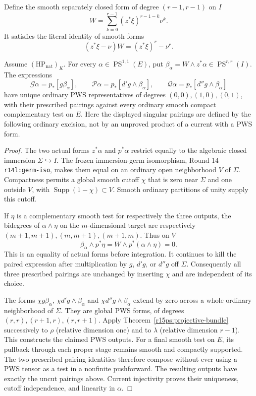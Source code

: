 Define the smooth separately closed form of degree $(r-1,r-1)$
on $I$
\[
             W=\sum_{k=0}^{r-1}(z^*\xi)^{r-1-k}\nu^k.
\tag{I15.8}\label{r15i:W}
\]
It satisfies the literal identity of smooth forms
\[
                      (z^*\xi-\nu)W=(z^*\xi)^r-\nu^r.
\tag{I15.9}\label{r15i:telescoping}
\]

\begin{proposition}
\label{r15i:outputs}
Assume $(\mathrm{HP}_{\mathrm{nat}})_K$.
For every $\alpha\in\operatorname{PS}^{1,1}(E)$, put
$\beta_\alpha=W\wedge z^*\alpha\in
\operatorname{PS}^{r,r}(I)$.  The expressions
\[
 \mathcal G\alpha=p_*[g\beta_\alpha],\qquad
 \mathcal P\alpha=p_*[d'g\wedge\beta_\alpha],\qquad
 \mathcal Q\alpha=p_*[d''g\wedge\beta_\alpha]
\tag{I15.10}\label{r15i:three-outputs}
\]
have unique ordinary PWS representatives of degrees
$(0,0),(1,0),(0,1)$, with their prescribed pairings against
every ordinary smooth compact complementary test on $E$.
Here the displayed singular pairings are defined by the
following ordinary excision, not by an unproved product of
a current with a PWS form.
\end{proposition}

\begin{proof}
The two actual forms $z^*\alpha$ and $p^*\alpha$ restrict
equally to the algebraic closed immersion $\Sigma\hookrightarrow I$.
The frozen immersion-germ isomorphism, Round 14
\texttt{r14l:germ-iso}, makes them equal on an ordinary open
neighborhood $V$ of $\Sigma$.  Compactness permits a global
smooth cutoff $\chi$ that is zero near $\Sigma$ and one
outside $V$, with $\operatorname{Supp}(1-\chi)\subset V$.
Smooth ordinary partitions of unity supply this cutoff.

If $\eta$ is a complementary smooth test for respectively
the three outputs, the bidegrees of $\alpha\wedge\eta$ on
the $m$-dimensional target are respectively
$(m+1,m+1),(m,m+1),(m+1,m)$.
Thus on $V$
\[
             \beta_\alpha\wedge p^*\eta
                 =W\wedge p^*(\alpha\wedge\eta)=0.
\tag{I15.11}\label{r15i:cutoff-zero}
\]
This is an equality of actual forms before integration.
It continues to kill the paired expression after multiplication
by $g$, $d'g$, or $d''g$ off $\Sigma$.
Consequently all three prescribed pairings are unchanged by
inserting $\chi$ and are independent of its choice.

The forms $\chi g\beta_\alpha$,
$\chi d'g\wedge\beta_\alpha$ and
$\chi d''g\wedge\beta_\alpha$ extend by zero across a
whole ordinary neighborhood of $\Sigma$.  They are global
PWS forms, of degrees $(r,r),(r+1,r),(r,r+1)$.
Apply Theorem~\ref{r15ps:projective-bundle} successively to
$\rho$ (relative dimension one) and to $\lambda$ (relative
dimension $r-1$).  This constructs the claimed PWS outputs.
For a final smooth test on $E$, its pullback through each
proper stage remains smooth and compactly supported.  The
two prescribed pairing identities therefore compose without
ever using a PWS tensor as a test in a nonfinite pushforward.
The resulting outputs have exactly the uncut pairings above.
Current injectivity proves their uniqueness, cutoff independence,
and linearity in $\alpha$.
\end{proof}

